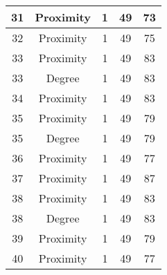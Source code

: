 \documentclass[results.tex]{subfiles}
\begin{document}
\begin{center}
\begin{tabular}{| c || c | c | c | c |}
            \hline
            31                      & Proximity                    & 1                      & 49                      & 73                   \\
            \hline
            32                      & Proximity                    & 1                      & 49                      & 75                   \\
            \hline
            33                      & Proximity                    & 1                      & 49                      & 83                   \\
            \hline
            33                      & Degree                       & 1                      & 49                      & 83                   \\
            \hline
            34                      & Proximity                    & 1                      & 49                      & 83                   \\
            \hline
            35                      & Proximity                    & 1                      & 49                      & 79                   \\
            \hline
            35                      & Degree                       & 1                      & 49                      & 79                   \\
            \hline
            36                      & Proximity                    & 1                      & 49                      & 77                   \\
            \hline
            37                      & Proximity                    & 1                      & 49                      & 87                   \\
            \hline
            38                      & Proximity                    & 1                      & 49                      & 83                   \\
            \hline
            38                      & Degree                       & 1                      & 49                      & 83                   \\
            \hline
            39                      & Proximity                    & 1                      & 49                      & 79                   \\
            \hline
            40                      & Proximity                    & 1                      & 49                      & 77                   \\

\end{tabular}
\end{center}
\end{document}
